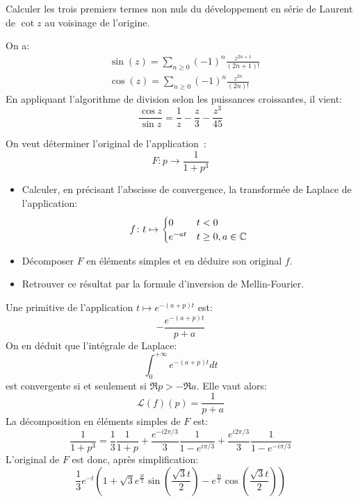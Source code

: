 \documentclass[a4paper, 12pt]{amsart}
\begin{document}
\begin{fex} 
    Calculer les trois premiers termes non nuls du développement en série de Laurent de $\cot z$ au voisinage de l'origine.
\end{fex} 
On a:
\[
\begin{split}
    & \sin(z) = \sum_{n\geq 0} (-1)^n \frac{z^{2n+1}}{(2n+1)!} \\
     & \cos(z) = \sum_{n\geq 0} (-1)^n \frac{z^{2n}}{(2n)!}
\end{split}
\]
En appliquant l'algorithme de division selon les puissances croissantes, il vient:
\[
\frac{\cos z}{\sin z} = \frac{1}{z} - \frac{z}{3} - \frac{z^3}{45}
\]
\begin{fex} 
On veut déterminer l'original de l'application~:
\[
F : p \to \frac{1}{1+p^3}
\]
\begin{itemize} 
\item Calculer, en précisant l'abscisse de convergence, la transformée de Laplace de l'application:
\[
f \colon t \mapsto \begin{cases}
    0 & t< 0 \\
    e^{-at} & t \geq 0, a \in \mathbb{C}
\end{cases}
\]
\item Décomposer $F$ en éléments simples et en déduire son original $f.$
\item Retrouver ce résultat par la formule d'inversion de Mellin-Fourier.
\end{itemize} 
\end{fex} 
Une primitive de l'application $t \mapsto e^{-(a+p)t}$ est:
\[
-\frac{e^{-(a+p)t}}{p+a}
\]
On en déduit que l'intégrale de Laplace:
\[
\int_0^{+\infty} e^{-(a+p)t} dt
\]
est convergente si et seulement si $\Re{p}> -\Re{a}.$
Elle vaut alors:
\[
\mathcal{L}(f)(p) = \frac{1}{p+a}
\]
La décomposition en éléments simples de $F$ est:
\[
\frac{1}{1+p^3} = \frac{1}{3} \frac{1}{1+p}
+\frac{e^{-i 2 \pi /3}}{3}\frac{1}{1-e^{i\pi /3}} 
+\frac{e^{i 2 \pi /3}}{3}\frac{1}{1-e^{-i \pi /3}}
\]
L'original de $F$ est donc, après simplification:
\[
\frac{1}{3} e^{-t} \left(1+\sqrt{3} e^{\frac{3 t}{2}} \sin \left(\frac{\sqrt{3} t}{2}\right) -e^{\frac{3 t}{2}} \cos \left(\frac{\sqrt{3} t}{2}\right)\right)
\]
\end{document}
